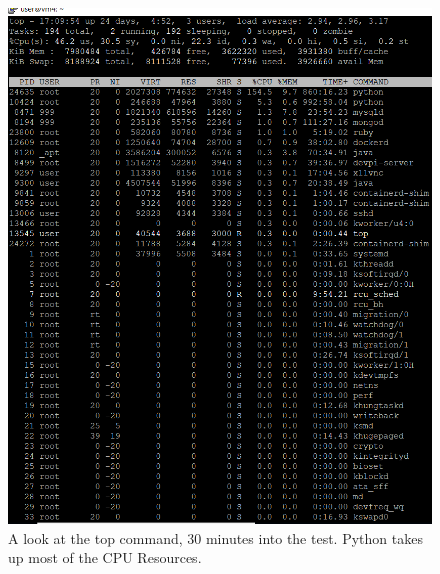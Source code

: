 \documentclass[12pt]{article}
\begin{document}
\begin{figure}[h!]
	\centering
	\includegraphics[width=\textwidth,height=\textheight,keepaspectratio]{intro/S2_harshit.png}
	\caption{A look at the top command, 30 minutes into the test. Python takes up most of the CPU Resources.}
\end{figure}
\end{document}
